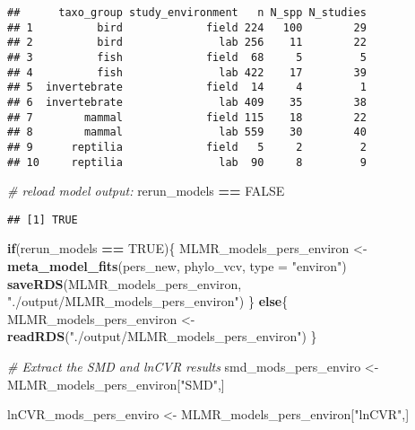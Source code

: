 \documentclass[]{article}
\newenvironment{Shaded}{\begin{snugshade}}{\end{snugshade}}
\newcommand{\KeywordTok}[1]{\textcolor[rgb]{0.13,0.29,0.53}{\textbf{#1}}}
\newcommand{\DataTypeTok}[1]{\textcolor[rgb]{0.13,0.29,0.53}{#1}}
\newcommand{\StringTok}[1]{\textcolor[rgb]{0.31,0.60,0.02}{#1}}
\newcommand{\CommentTok}[1]{\textcolor[rgb]{0.56,0.35,0.01}{\textit{#1}}}
\newcommand{\OtherTok}[1]{\textcolor[rgb]{0.56,0.35,0.01}{#1}}
\newcommand{\ControlFlowTok}[1]{\textcolor[rgb]{0.13,0.29,0.53}{\textbf{#1}}}
\newcommand{\OperatorTok}[1]{\textcolor[rgb]{0.81,0.36,0.00}{\textbf{#1}}}
\newcommand{\NormalTok}[1]{#1}
\begin{document}
\begin{verbatim}
##      taxo_group study_environment   n N_spp N_studies
## 1          bird             field 224   100        29
## 2          bird               lab 256    11        22
## 3          fish             field  68     5         5
## 4          fish               lab 422    17        39
## 5  invertebrate             field  14     4         1
## 6  invertebrate               lab 409    35        38
## 7        mammal             field 115    18        22
## 8        mammal               lab 559    30        40
## 9      reptilia             field   5     2         2
## 10     reptilia               lab  90     8         9
\end{verbatim}

\begin{Shaded}
\begin{Highlighting}[]
\CommentTok{# reload model output:}
\NormalTok{rerun_models }\OperatorTok{==}\StringTok{ }\OtherTok{FALSE}
\end{Highlighting}
\end{Shaded}

\begin{verbatim}
## [1] TRUE
\end{verbatim}

\begin{Shaded}
\begin{Highlighting}[]
  \ControlFlowTok{if}\NormalTok{(rerun_models }\OperatorTok{==}\StringTok{ }\OtherTok{TRUE}\NormalTok{)\{}
\NormalTok{      MLMR_models_pers_environ <-}\StringTok{ }\KeywordTok{meta_model_fits}\NormalTok{(pers_new, phylo_vcv, }\DataTypeTok{type =} \StringTok{"environ"}\NormalTok{)}
      \KeywordTok{saveRDS}\NormalTok{(MLMR_models_pers_environ, }\StringTok{"./output/MLMR_models_pers_environ"}\NormalTok{)}
\NormalTok{    \} }\ControlFlowTok{else}\NormalTok{\{}
\NormalTok{     MLMR_models_pers_environ <-}\StringTok{ }\KeywordTok{readRDS}\NormalTok{(}\StringTok{"./output/MLMR_models_pers_environ"}\NormalTok{)}
\NormalTok{    \}}

\CommentTok{# Extract the SMD and lnCVR results}
\NormalTok{  smd_mods_pers_enviro <-}\StringTok{ }\NormalTok{MLMR_models_pers_environ[}\StringTok{"SMD"}\NormalTok{,]}
      
\NormalTok{  lnCVR_mods_pers_enviro <-}\StringTok{ }\NormalTok{MLMR_models_pers_environ[}\StringTok{"lnCVR"}\NormalTok{,]}
\end{Highlighting}
\end{Shaded}
\end{document}
